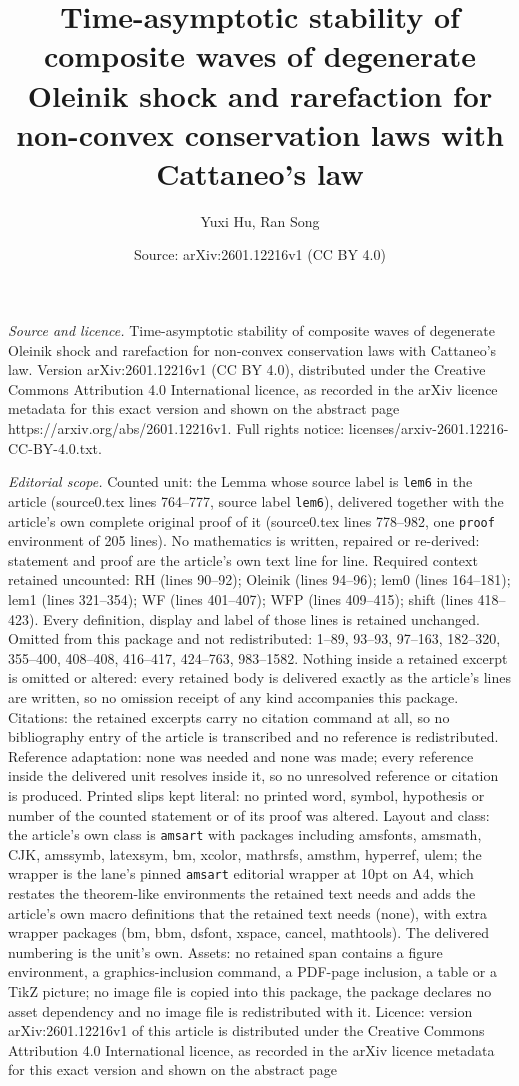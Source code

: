 \documentclass[10pt,a4paper]{amsart}
\title[Time-asymptotic stability of composite waves of degenerate O]{Time-asymptotic stability of composite waves of degenerate Oleinik shock and rarefaction for non-convex conservation laws with Cattaneo's law}
\author{Yuxi Hu, Ran Song}
\date{Source: arXiv:2601.12216v1 (CC BY 4.0)}
\begin{document}
\maketitle

\noindent\emph{Source and licence.} Time-asymptotic stability of composite waves of degenerate Oleinik shock and rarefaction for non-convex conservation laws with Cattaneo's law. Version arXiv:2601.12216v1 (CC BY 4.0), distributed under the Creative Commons Attribution 4.0 International licence, as recorded in the arXiv licence metadata for this exact version and shown on the abstract page https://arxiv.org/abs/2601.12216v1. Full rights notice: licenses/arxiv-2601.12216-CC-BY-4.0.txt.\par\smallskip

\noindent\textit{Editorial scope.} Counted unit: the Lemma whose source label is \texttt{lem6} in the article (source0.tex lines 764--777, source label \texttt{lem6}), delivered together with the article's own complete original proof of it (source0.tex lines 778--982, one \texttt{proof} environment of 205 lines). No mathematics is written, repaired or re-derived: statement and proof are the article's own text line for line. Required context retained uncounted: RH (lines 90--92); Oleinik (lines 94--96); lem0 (lines 164--181); lem1 (lines 321--354); WF (lines 401--407); WFP (lines 409--415); shift (lines 418--423). Every definition, display and label of those lines is retained unchanged. Omitted from this package and not redistributed: 1--89, 93--93, 97--163, 182--320, 355--400, 408--408, 416--417, 424--763, 983--1582. Nothing inside a retained excerpt is omitted or altered: every retained body is delivered exactly as the article's lines are written, so no omission receipt of any kind accompanies this package. Citations: the retained excerpts carry no citation command at all, so no bibliography entry of the article is transcribed and no reference is redistributed. Reference adaptation: none was needed and none was made; every reference inside the delivered unit resolves inside it, so no unresolved reference or citation is produced. Printed slips kept literal: no printed word, symbol, hypothesis or number of the counted statement or of its proof was altered. Layout and class: the article's own class is \texttt{amsart} with packages including amsfonts, amsmath, CJK, amssymb, latexsym, bm, xcolor, mathrsfs, amsthm, hyperref, ulem; the wrapper is the lane's pinned \texttt{amsart} editorial wrapper at 10pt on A4, which restates the theorem-like environments the retained text needs and adds the article's own macro definitions that the retained text needs (none), with extra wrapper packages (bm, bbm, dsfont, xspace, cancel, mathtools). The delivered numbering is the unit's own. Assets: no retained span contains a figure environment, a graphics-inclusion command, a PDF-page inclusion, a table or a TikZ picture; no image file is copied into this package, the package declares no asset dependency and no image file is redistributed with it. Licence: version arXiv:2601.12216v1 of this article is distributed under the Creative Commons Attribution 4.0 International licence, as recorded in the arXiv licence metadata for this exact version and shown on the abstract page 
\end{document}
